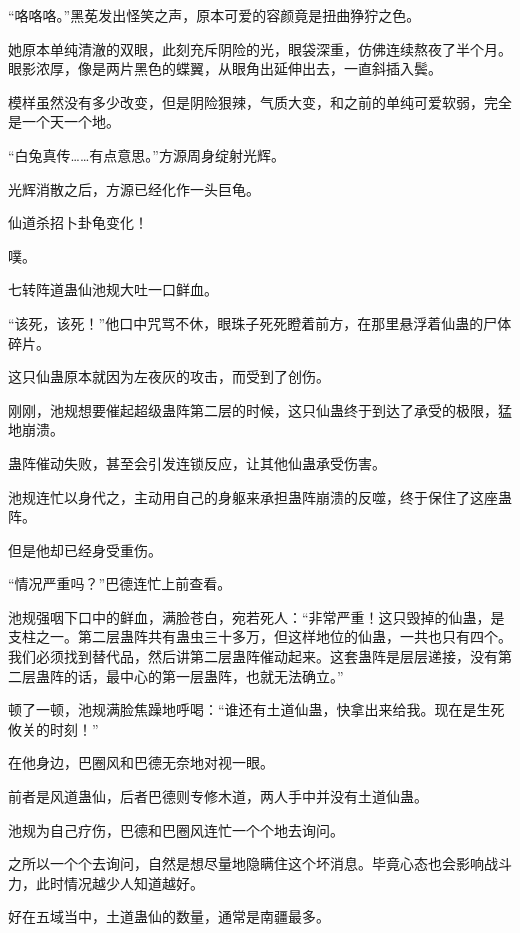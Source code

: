 
\begin{this_body}



“咯咯咯。”黑莬发出怪笑之声，原本可爱的容颜竟是扭曲狰狞之色。

她原本单纯清澈的双眼，此刻充斥阴险的光，眼袋深重，仿佛连续熬夜了半个月。眼影浓厚，像是两片黑色的蝶翼，从眼角出延伸出去，一直斜插入鬓。

模样虽然没有多少改变，但是阴险狠辣，气质大变，和之前的单纯可爱软弱，完全是一个天一个地。

“白兔真传……有点意思。”方源周身绽射光辉。

光辉消散之后，方源已经化作一头巨龟。

仙道杀招卜卦龟变化！

噗。

七转阵道蛊仙池规大吐一口鲜血。

“该死，该死！”他口中咒骂不休，眼珠子死死瞪着前方，在那里悬浮着仙蛊的尸体碎片。

这只仙蛊原本就因为左夜灰的攻击，而受到了创伤。

刚刚，池规想要催起超级蛊阵第二层的时候，这只仙蛊终于到达了承受的极限，猛地崩溃。

蛊阵催动失败，甚至会引发连锁反应，让其他仙蛊承受伤害。

池规连忙以身代之，主动用自己的身躯来承担蛊阵崩溃的反噬，终于保住了这座蛊阵。

但是他却已经身受重伤。

“情况严重吗？”巴德连忙上前查看。

池规强咽下口中的鲜血，满脸苍白，宛若死人：“非常严重！这只毁掉的仙蛊，是支柱之一。第二层蛊阵共有蛊虫三十多万，但这样地位的仙蛊，一共也只有四个。我们必须找到替代品，然后讲第二层蛊阵催动起来。这套蛊阵是层层递接，没有第二层蛊阵的话，最中心的第一层蛊阵，也就无法确立。”

顿了一顿，池规满脸焦躁地呼喝：“谁还有土道仙蛊，快拿出来给我。现在是生死攸关的时刻！”

在他身边，巴圈风和巴德无奈地对视一眼。

前者是风道蛊仙，后者巴德则专修木道，两人手中并没有土道仙蛊。

池规为自己疗伤，巴德和巴圈风连忙一个个地去询问。

之所以一个个去询问，自然是想尽量地隐瞒住这个坏消息。毕竟心态也会影响战斗力，此时情况越少人知道越好。

好在五域当中，土道蛊仙的数量，通常是南疆最多。


\end{this_body}
